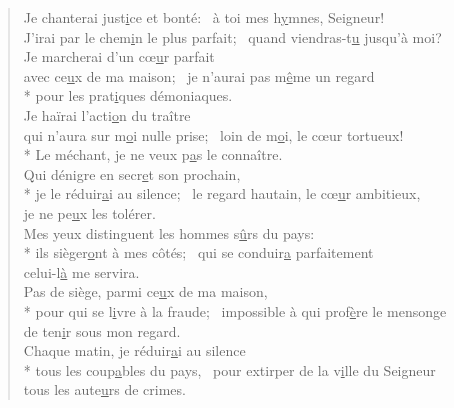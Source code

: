 
\begin{verse}
Je chanterai just\underline{i}ce et bonté:~\psalmstar
à toi mes h\underline{y}mnes, Seigneur! \\
J’irai par le chem\underline{i}n le plus parfait;~\psalmstar
quand viendras-t\underline{u} jusqu’à moi? \\

Je marcherai d’un cœ\underline{u}r parfait \\
avec ce\underline{u}x de ma maison;~\psalmstar
{}je n’aurai pas m\underline{ê}me un regard \\*
pour les prat\underline{i}ques démoniaques. \\

Je haïrai l’acti\underline{o}n du traître \\
qui n’aura sur m\underline{o}i nulle prise;~\psalmstar
{}loin de m\underline{o}i, le cœur tortueux! \\*
Le méchant, je ne veux p\underline{a}s le connaître. \\

Qui dénigre en secr\underline{e}t son prochain, \\*
je le réduir\underline{a}i au silence;~\psalmstar
le regard hautain, le cœ\underline{u}r ambitieux, \\
je ne pe\underline{u}x les tolérer. \\

Mes yeux distinguent les hommes s\underline{û}rs du pays: \\*
ils sièger\underline{o}nt à mes côtés;~\psalmstar
qui se conduir\underline{a} parfaitement \\
celui-l\underline{à} me servira. \\

Pas de siège, parmi ce\underline{u}x de ma maison, \\*
pour qui se l\underline{i}vre à la fraude;~\psalmstar
impossible à qui prof\underline{è}re le mensonge \\
de ten\underline{i}r sous mon regard. \\

Chaque matin, je réduir\underline{a}i au silence \\*
tous les coup\underline{a}bles du pays,~\psalmstar
pour extirper de la v\underline{i}lle du Seigneur \\
tous les aute\underline{u}rs de crimes. \\
\end{verse}

